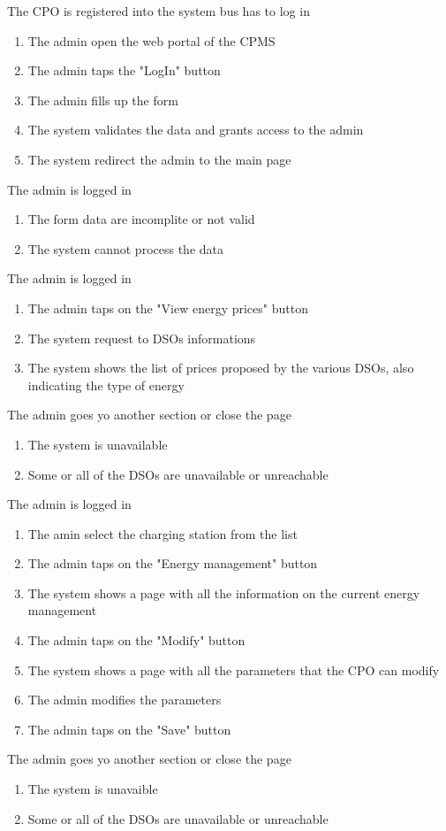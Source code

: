 \begin{enumerate}
	{The CPO is registered into the system bus has to log in}
	{
	\begin{enumerate}[1.]
	\item The admin open the web portal of the CPMS
	\item The admin taps the "LogIn" button 
	\item The admin fills up the form
	\item The system validates the data and grants access to the admin
	\item The system redirect the admin to the main page
	\end{enumerate}
	}
	{The admin is logged in}
	{
	\begin{enumerate}[1.]
	\item The form data are incomplite or not valid 
	\item The system cannot process the data
	\end{enumerate}
	}
	
	
	{The admin is logged in }
	{
	\begin{enumerate}[1.]
	\item The admin taps on the "View energy prices" button 
	\item The system request to DSOs informations 
	\item The system shows the list of prices proposed by the various DSOs, also indicating the type of energy
	\end{enumerate}
	}
	{The admin goes yo another section or close the page }
	{
	\begin{enumerate}[1.]
	\item The system is unavailable
	\item Some or all of the DSOs are unavailable or unreachable
	\end{enumerate}
	}
	
	
	{The admin is logged in}
	{
	\begin{enumerate}[1.]
	\item The amin select the charging station from the list
	\item The admin taps on the "Energy management" button
	\item The system shows a page with all the information on the current energy management
	\item The admin taps on the "Modify" button
	\item The system shows a page with all the parameters that the CPO can modify
	\item The admin modifies the parameters
	\item The admin taps on the "Save" button
	\end{enumerate}
	}
	{The admin goes yo another section or close the page }
	{
	\begin{enumerate}[1.]
	\item The system is unavaible
	\item Some or all of the DSOs are unavailable or unreachable
	\end{enumerate}
	}
	

\end{enumerate}
